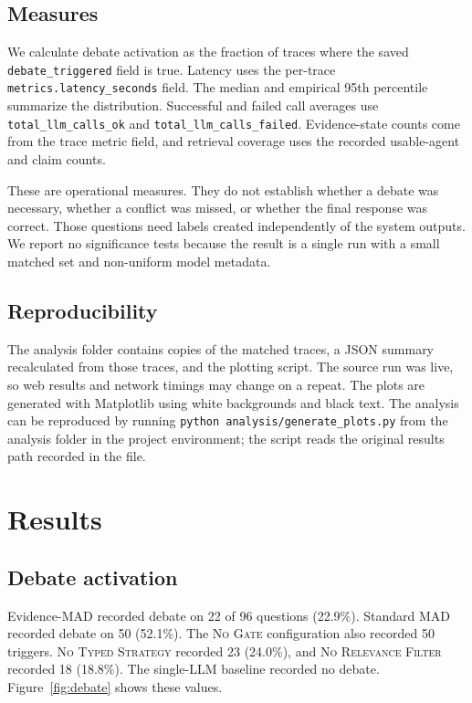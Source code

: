 \documentclass[conference]{IEEEtran}
\begin{document}
\subsection{Measures}
We calculate debate activation as the fraction of traces where the saved \texttt{debate\_triggered} field is true. Latency uses the per-trace \texttt{metrics.latency\_seconds} field. The median and empirical 95th percentile summarize the distribution. Successful and failed call averages use \texttt{total\_llm\_calls\_ok} and \texttt{total\_llm\_calls\_failed}. Evidence-state counts come from the trace metric field, and retrieval coverage uses the recorded usable-agent and claim counts.

These are operational measures. They do not establish whether a debate was necessary, whether a conflict was missed, or whether the final response was correct. Those questions need labels created independently of the system outputs. We report no significance tests because the result is a single run with a small matched set and non-uniform model metadata.

\subsection{Reproducibility}
The analysis folder contains copies of the matched traces, a JSON summary recalculated from those traces, and the plotting script. The source run was live, so web results and network timings may change on a repeat. The plots are generated with Matplotlib using white backgrounds and black text. The analysis can be reproduced by running \texttt{python analysis/generate\_plots.py} from the analysis folder in the project environment; the script reads the original results path recorded in the file.

\section{Results}
\subsection{Debate activation}
Evidence-MAD recorded debate on 22 of 96 questions (22.9\%). Standard MAD recorded debate on 50 (52.1\%). The \textsc{No Gate} configuration also recorded 50 triggers. \textsc{No Typed Strategy} recorded 23 (24.0\%), and \textsc{No Relevance Filter} recorded 18 (18.8\%). The single-LLM baseline recorded no debate. Figure~\ref{fig:debate} shows these values.
\end{document}
